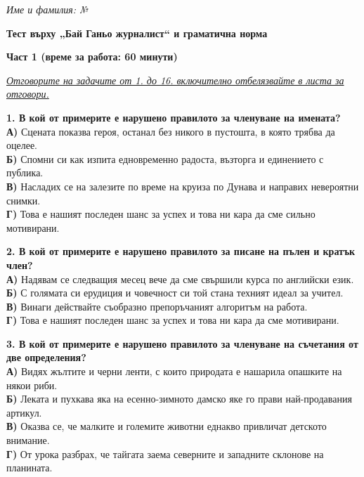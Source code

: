 \documentclass[12pt,a4paper]{article}
\begin{document}
\noindent
\textit{Име и фамилия:} \dotfill \textit{№} \makebox[2cm]{\dotfill}

\vspace{0.6cm}

\noindent
\begin{center}
  \textbf{\large\bfseries Тест върху „Бай Ганьо журналист“ и граматична норма}
\end{center}

\noindent
\textbf{Част 1 (време за работа: 60 минути)}

\vspace{0.3cm}

\noindent
\underline{\textit{Отговорите на задачите от 1. до 16. включително отбелязвайте в листа за отговори.}}

\vspace{0.5cm}

\noindent
\textbf{1. В кой от примерите е нарушено правилото за членуване на имената?} \\
\noindent
\textbf{А)} Сцената показва героя, останал без никого в пустошта, в която трябва да оцелее. \\
\textbf{Б)} Спомни си как изпита едновременно радоста, възторга и единението с публика. \\
\textbf{В)} Насладих се на залезите по време на круиза по Дунава и направих невероятни снимки. \\
\textbf{Г)} Това е нашият последен шанс за успех и това ни кара да сме сильно мотивирани.

\vspace{0.6cm}

\noindent
\textbf{2. В кой от примерите е нарушено правилото за писане на пълен и кратък член?} \\
\textbf{А)} Надявам се следващия месец вече да сме свършили курса по английски език. \\
\textbf{Б)} С голямата си ерудиция и човечност си той стана техният идеал за учител. \\
\textbf{В)} Винаги действайте съобразно препоръчаният алгоритъм на работа. \\
\textbf{Г)} Това е нашият последен шанс за успех и това ни кара да сме мотивирани.

\vspace{0.6cm}

\noindent
\textbf{3. В кой от примерите е нарушено правилото за членуване на съчетания от две определения?} \\
\textbf{А)} Видях жълтите и черни ленти, с които природата е нашарила опашките на някои риби. \\
\textbf{Б)} Леката и пухкава яка на есенно-зимното дамско яке го прави най-продавания артикул. \\
\textbf{В)} Оказва се, че малките и големите животни еднакво привличат детското внимание. \\
\textbf{Г)} От урока разбрах, че тайгата заема северните и западните склонове на планината.
\end{document}
